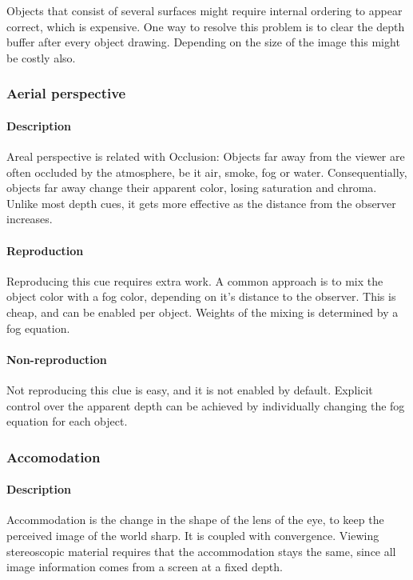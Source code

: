 Objects that consist of several surfaces might require internal ordering to appear correct, which is expensive. One way to resolve this problem is to clear the depth buffer after every object drawing. Depending on the size of the image this might be costly also.


\subsubsection{Aerial perspective}
\paragraph{Description}
Areal perspective is related with Occlusion:
Objects far away from the viewer are often occluded by the atmosphere, be it air, smoke, fog or water.
Consequentially, objects far away change their apparent color, losing saturation and chroma.
Unlike most depth cues, it gets more effective as the distance from the observer increases.

\paragraph{Reproduction}
Reproducing this cue requires extra work. A common approach is to mix the object color with a fog color, depending on it's distance to the observer. This is cheap, and can be enabled per object\cite{fog}. Weights of the mixing is determined by a fog equation.

\paragraph{Non-reproduction}
Not reproducing this clue is easy, and it is not enabled by default.
Explicit control over the apparent depth can be achieved by individually changing the fog equation for each object.


\subsubsection{Accomodation}
\paragraph{Description}
Accommodation is the change in the shape of the lens of the eye, to keep the perceived image of the world sharp\cite{accommodation}. It is coupled with convergence. Viewing stereoscopic material requires that the accommodation stays the same, since all image information comes from a screen at a fixed depth.

